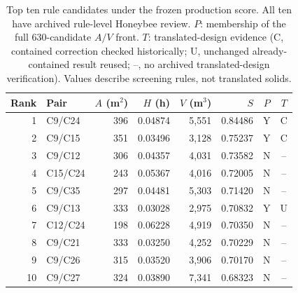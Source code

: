 \begin{table}[tbp]
\caption{Top ten rule candidates under the frozen production score. All ten have archived rule-level Honeybee review. $P$: membership of the full 630-candidate $A/V$ front. $T$: translated-design evidence (C, contained correction checked historically; U, unchanged already-contained result reused; --, no archived translated-design verification). Values describe screening rules, not translated solids.}
\label{tab:topten}\centering\small
\setlength{\tabcolsep}{3.2pt}
\begin{tabular}{rlrrrrcc}\toprule
Rank & Pair & $A$ (m$^2$) & $H$ (h) & $V$ (m$^3$) & $S$ & $P$ & $T$\\\midrule
1 & C9/C24 & 396 & 0.04874 & 5,551 & 0.84486 & Y & C\\
2 & C9/C15 & 351 & 0.03496 & 3,128 & 0.75237 & Y & C\\
3 & C9/C12 & 306 & 0.04357 & 4,031 & 0.73582 & N & --\\
4 & C15/C24 & 243 & 0.05367 & 4,016 & 0.72005 & N & --\\
5 & C9/C35 & 297 & 0.04481 & 5,303 & 0.71420 & N & --\\
6 & C9/C13 & 333 & 0.03028 & 2,975 & 0.70832 & Y & U\\
7 & C12/C24 & 198 & 0.06228 & 4,919 & 0.70350 & N & --\\
8 & C9/C21 & 333 & 0.03250 & 4,252 & 0.70229 & N & --\\
9 & C9/C26 & 315 & 0.03520 & 3,906 & 0.70170 & N & --\\
10 & C9/C27 & 324 & 0.03890 & 7,341 & 0.68323 & N & --\\
\bottomrule\end{tabular}
\end{table}
